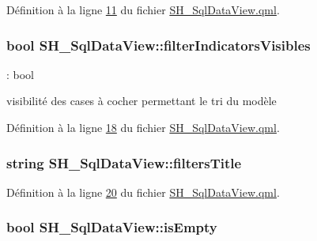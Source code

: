 Définition à la ligne \hyperlink{SH__SqlDataView_8qml_source_l00011}{11} du fichier \hyperlink{SH__SqlDataView_8qml_source}{S\-H\-\_\-\-Sql\-Data\-View.\-qml}.

\hypertarget{classSH__SqlDataView_afdc0805dc2ce3af4e9ce5331a81d7e13}{
\subsubsection[{filter\-Indicators\-Visibles}]{\setlength{\rightskip}{0pt plus 5cm}bool S\-H\-\_\-\-Sql\-Data\-View\-::filter\-Indicators\-Visibles}}\label{classSH__SqlDataView_afdc0805dc2ce3af4e9ce5331a81d7e13}


\-: bool 

visibilité des cases à cocher permettant le tri du modèle 

Définition à la ligne \hyperlink{SH__SqlDataView_8qml_source_l00018}{18} du fichier \hyperlink{SH__SqlDataView_8qml_source}{S\-H\-\_\-\-Sql\-Data\-View.\-qml}.

\hypertarget{classSH__SqlDataView_a96eb074075b9ba561603a081992a1cfc}{
\subsubsection[{filters\-Title}]{\setlength{\rightskip}{0pt plus 5cm}string S\-H\-\_\-\-Sql\-Data\-View\-::filters\-Title}}\label{classSH__SqlDataView_a96eb074075b9ba561603a081992a1cfc}


Définition à la ligne \hyperlink{SH__SqlDataView_8qml_source_l00020}{20} du fichier \hyperlink{SH__SqlDataView_8qml_source}{S\-H\-\_\-\-Sql\-Data\-View.\-qml}.

\hypertarget{classSH__SqlDataView_a3ceaf016d4dace986a92e2e77772bac9}{
\subsubsection[{is\-Empty}]{\setlength{\rightskip}{0pt plus 5cm}bool S\-H\-\_\-\-Sql\-Data\-View\-::is\-Empty}}\label{classSH__SqlDataView_a3ceaf016d4dace986a92e2e77772bac9}


